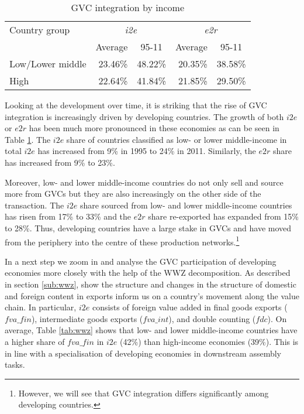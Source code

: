 \documentclass[11pt,a4paper]{article}
\begin{document}
\begin{table}[htbp]\small
  \centering
  \caption{GVC integration by income}
    \begin{tabular}{lrrrr}
    \toprule
    Country group & \multicolumn{2}{c}{\textit{i2e}} & \multicolumn{2}{c}{\textit{e2r}} \\
          & \multicolumn{1}{c}{Average} & \multicolumn{1}{c}{95-11} & \multicolumn{1}{c}{Average} & \multicolumn{1}{c}{95-11} \\
              \midrule
    Low/Lower middle & 23.46\% & 48.22\% & 20.35\% & 38.58\% \\
    High & 22.64\% & 41.84\% & 21.85\% & 29.50\% \\
    \bottomrule
    \end{tabular}
  \label{tab:gvc}
\end{table}

Looking at the development over time, it is striking that the rise of GVC integration is increasingly driven by developing countries. The growth of both $i2e$ or $e2r$ has been much more pronounced in these economies as can be seen in Table \ref{tab:gvc}. The $i2e$ share of countries classified as low- or lower middle-income in total $i2e$ has increased from 9\% in 1995 to 24\% in 2011. Similarly, the $e2r$ share has increased from 9\% to 23\%.

Moreover, low- and lower middle-income countries do not only sell and source more from GVCs but they are also increasingly on the other side of the transaction. The $i2e$ share sourced from low- and lower middle-income countries has risen from 17\% to 33\% and the $e2r$ share re-exported has expanded from 15\% to 28\%. Thus, developing countries have a large stake in GVCs and have moved from the periphery into the centre of these production networks.\footnote{However, we will see that GVC integration differs significantly among developing countries.}


In a next step we zoom in and analyse the GVC participation of developing economies more closely with the help of the WWZ decomposition. As described in section \ref{sub:wwz}, \citet{zhwaetal13} show the structure and changes in the structure of domestic and foreign content in exports inform us on a country's movement along the value chain. In particular, $i2e$ consists of foreign value added in final goods exports ($fva\_fin$), intermediate goods exports ($fva\_int$), and double counting ($fdc$). On average, Table \ref{tab:wwz} shows that low- and lower middle-income countries have a higher share of $fva\_fin$ in $i2e$ (42\%) than high-income economies (39\%). This is in line with a specialisation of developing economies in downstream assembly tasks.
\end{document}
